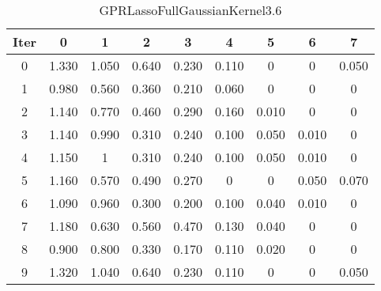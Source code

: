\begin{table}
	\begin{center}
		\begin{tabular}{|c|c|c|c|c|c|c|c|c|}
			\hline
			Iter & 0 & 1 & 2 & 3 & 4 & 5 & 6 & 7 \\
			\hline
			0 & 1.330 & 1.050 & 0.640 & 0.230 & 0.110 & 0 & 0 & 0.050 \\
			\hline
			1 & 0.980 & 0.560 & 0.360 & 0.210 & 0.060 & 0 & 0 & 0 \\
			\hline
			2 & 1.140 & 0.770 & 0.460 & 0.290 & 0.160 & 0.010 & 0 & 0 \\
			\hline
			3 & 1.140 & 0.990 & 0.310 & 0.240 & 0.100 & 0.050 & 0.010 & 0 \\
			\hline
			4 & 1.150 & 1 & 0.310 & 0.240 & 0.100 & 0.050 & 0.010 & 0 \\
			\hline
			5 & 1.160 & 0.570 & 0.490 & 0.270 & 0 & 0 & 0.050 & 0.070 \\
			\hline
			6 & 1.090 & 0.960 & 0.300 & 0.200 & 0.100 & 0.040 & 0.010 & 0 \\
			\hline
			7 & 1.180 & 0.630 & 0.560 & 0.470 & 0.130 & 0.040 & 0 & 0 \\
			\hline
			8 & 0.900 & 0.800 & 0.330 & 0.170 & 0.110 & 0.020 & 0 & 0 \\
			\hline
			9 & 1.320 & 1.040 & 0.640 & 0.230 & 0.110 & 0 & 0 & 0.050 \\
			\hline
		\end{tabular}
	\end{center}
	\caption{GPRLassoFullGaussianKernel3.6}
\end{table}